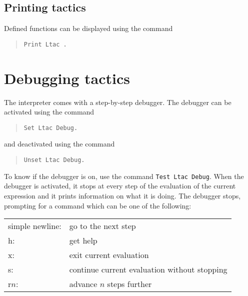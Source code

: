 

\subsection{Printing {\ltac} tactics}

Defined {\ltac} functions can be displayed using the command

\begin{quote}
{\tt Print Ltac {\qualid}.}
\end{quote}

\section{Debugging {\ltac} tactics}

The {\ltac} interpreter comes with a step-by-step debugger. The
debugger can be activated using the command

\begin{quote}
{\tt Set Ltac Debug.}
\end{quote}

\noindent and deactivated using the command

\begin{quote}
{\tt Unset Ltac Debug.}
\end{quote}

To know if the debugger is on, use the command \texttt{Test Ltac Debug}.
When the debugger is activated, it stops at every step of the
evaluation of the current {\ltac} expression and it prints information
on what it is doing. The debugger stops, prompting for a command which
can be one of the following:

\medskip
\begin{tabular}{ll}
simple newline: & go to the next step\\
h: & get help\\
x: & exit current evaluation\\
s: & continue current evaluation without stopping\\
r$n$: & advance $n$ steps further\\
\end{tabular}
\endinput

